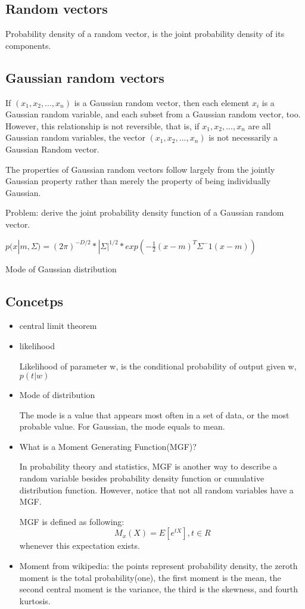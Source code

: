 \documentclass[10pt,a4paper]{book}
\begin{document}
	\subsection{Random vectors}
	
	Probability density of a random vector, is the joint probability density of its components.
	
	\subsection {Gaussian random vectors}
	
	If $(x_1, x_2, ..., x_n)$ is a Gaussian random vector, then each element $x_i$ is a Gaussian random variable, and each subset from a Gaussian random vector, too. However, this relationship is not reversible, that is, if $x_1, x_2, ..., x_n$ are all Gaussian random variables, the vector $(x_1, x_2, ..., x_n)$ is not necessarily a Gaussian Random vector.
	
	The properties of Gaussian random vectors follow largely from the jointly Gaussian property rather than merely the property of being individually Gaussian.
	
	Problem: derive the joint probability density function of a Gaussian random vector. 
	
	$p(x|m, \Sigma) = (2 \pi )^{-D/2} *|\Sigma|^{1/2}* exp(-{\frac 1 2}(x-m)^T \Sigma^-1 (x-m))$

	Mode of Gaussian distribution

	\subsection{Concetps}
		\begin{itemize}
		\item central limit theorem
		
		\item likelihood 
		
		Likelihood of parameter w, is the conditional probability of output given w, $p(t|w)$
		
		\item Mode of distribution
		
		The mode is a value that appears most often in a set of data, or the most probable value.
		For Gaussian, the mode equals to mean.
		
		\item What is a Moment Generating Function(MGF)?  
		
		
		In probability theory and statistics, MGF is another way to describe a random variable besides probability density function or cumulative distribution function. However, notice that not all random variables have a MGF.
		
		
		MGF is defined as following:
		$$M_x(X) = E[e^{tX}], t \in R$$ whenever this expectation exists. 

		
		\item Moment	
		from wikipedia: the points represent probability density, the zeroth moment is the total probability(one), the first moment is the mean, the second central moment is the variance, the third is the skewness, and fourth kurtosis.
		\end{itemize}
\end{document}
